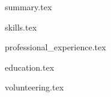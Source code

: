 \documentclass{resume} %
\begin{document}
\vspace{-0.5em}
{summary.tex}

\vspace{-0.5em}
{skills.tex}

\vspace{-0.5em}
{professional_experience.tex}

\vspace{-0.5em}
{education.tex}

\vspace{-0.5em}
{volunteering.tex}



\end{document}
